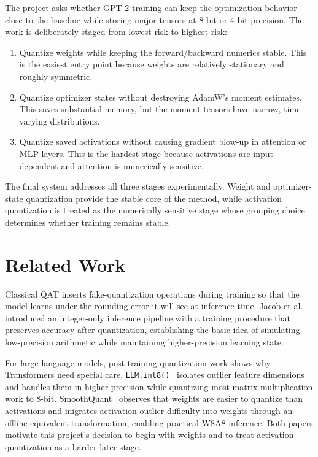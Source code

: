 \documentclass{article}
\begin{document}
The project asks whether GPT-2 training can keep the optimization behavior close to the
baseline while storing major tensors at 8-bit or 4-bit precision. The work is deliberately
staged from lowest risk to highest risk:

\begin{enumerate}
  \item Quantize weights while keeping the forward/backward numerics stable. This is the
  easiest entry point because weights are relatively stationary and roughly symmetric.
  \item Quantize optimizer states without destroying AdamW's moment estimates. This saves
  substantial memory, but the moment tensors have narrow, time-varying distributions.
  \item Quantize saved activations without causing gradient blow-up in attention or MLP
  layers. This is the hardest stage because activations are input-dependent and attention is
  numerically sensitive.
\end{enumerate}

The final system addresses all three stages experimentally. Weight and optimizer-state
quantization provide the stable core of the method, while activation quantization is treated
as the numerically sensitive stage whose grouping choice determines whether training remains
stable.

\section{Related Work}

Classical QAT inserts fake-quantization operations during training so that the model learns
under the rounding error it will see at inference time. Jacob et al.~\cite{jacob2017quantization}
introduced an integer-only inference pipeline with a training procedure that preserves
accuracy after quantization, establishing the basic idea of simulating low-precision
arithmetic while maintaining higher-precision learning state.

For large language models, post-training quantization work shows why Transformers need
special care. \texttt{LLM.int8()}~\cite{dettmers2022llmint8} isolates outlier feature
dimensions and handles them in higher precision while quantizing most matrix multiplication
work to 8-bit. SmoothQuant~\cite{xiao2022smoothquant} observes that weights are easier to
quantize than activations and migrates activation outlier difficulty into weights through an
offline equivalent transformation, enabling practical W8A8 inference. Both papers motivate
this project's decision to begin with weights and to treat activation quantization as a
harder later stage.
\end{document}
